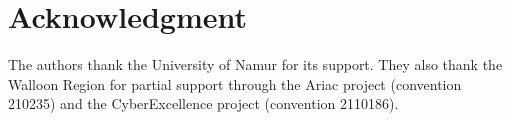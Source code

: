 \section{Acknowledgment}

The authors thank the University of Namur for its support. They also
thank the Walloon Region for partial support through the Ariac project
(convention 210235) and the CyberExcellence project (convention 2110186).


